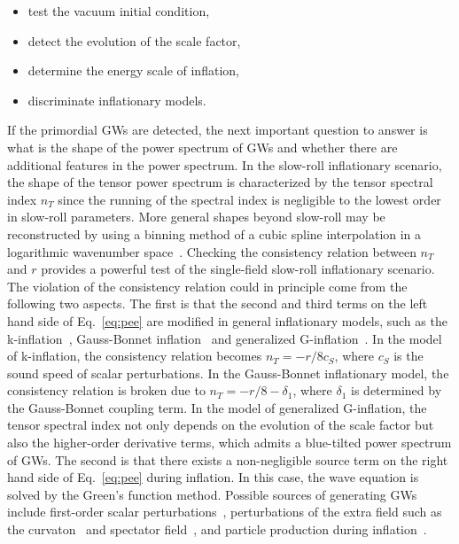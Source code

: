 \documentclass[a4paper,11pt]{article}
\begin{document}
\begin{itemize}
\item test the vacuum initial condition,
\item detect the evolution of the scale factor,
\item determine the energy scale of inflation,
\item discriminate inflationary models.
\end{itemize}


If the primordial GWs are detected, the next important question to answer is what is the shape of the power spectrum of GWs and whether there are additional features in the power spectrum. In the slow-roll inflationary scenario, the shape of the tensor power spectrum is characterized by the tensor spectral index $n_T$ since the running of the spectral index is negligible to the  lowest order in slow-roll parameters.
More general shapes beyond slow-roll may be reconstructed by using a binning method of a cubic spline interpolation in a logarithmic wavenumber space~\cite{Guo:2011re,Guo:2011hy,Hu:2014aua}. Checking the consistency relation between $n_T$ and $r$ provides a powerful test of the single-field slow-roll inflationary scenario. The violation of the consistency relation could in principle come from the following two aspects. The first  is that the second and third terms on the left hand side of Eq.~\eqref{eq:pee} are modified in general inflationary models, such as the k-inflation~\cite{ArmendarizPicon:1999rj}, Gauss-Bonnet inflation~\cite{Guo:2009uk,Guo:2010jr,Jiang:2013gza} and generalized G-inflation~\cite{Kobayashi:2011nu}. In the model of k-inflation, the consistency relation becomes $n_{T}=-r/8c_S$, where $c_S$ is the sound speed of scalar perturbations. In the Gauss-Bonnet inflationary model, the consistency relation is broken due to $n_{T}=-r/8-\delta_1$, where $\delta_1$ is determined by the Gauss-Bonnet coupling term. In the model of generalized G-inflation, the tensor spectral index not only depends on the evolution of the scale factor but also the higher-order derivative terms, which admits a blue-tilted power spectrum of GWs. The second is that there exists a non-negligible source term on the right hand side of Eq.~\eqref{eq:pee} during inflation. In this case, the wave equation is solved by the Green's function method. Possible sources of generating GWs include first-order scalar perturbations~\cite{Matarrese:1997ay}, perturbations of the extra field such as the curvaton~\cite{Bartolo:2007vp} and spectator field~\cite{Biagetti:2013kwa,Biagetti:2014asa}, and particle production during inflation~\cite{Cook:2011hg}.
\end{document}
